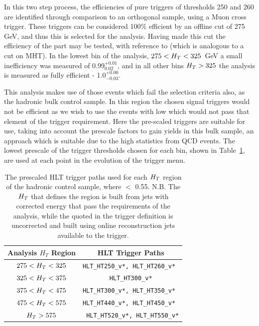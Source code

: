 In this two step process, the efficiencies of pure \HT triggers of thresholds 250 and 260 are identified through comparison to an orthogonal sample, using a Muon \HT cross trigger. These triggers can be considered 100\% efficient by an offline \HT cut of 275 GeV, and thus this is selected for the analysis. Having made this cut the efficiency of the \MHT part may be tested, with reference to \alt (which is analogous to a cut on MHT). In the lowest bin of the analysis, $275 < H_{T}  < 325$~GeV a small inefficiency was measured of 0.99$^{+0.01}_{0.02}$, and in all other bins $H_{T}  > 325$ the analysis is measured as fully efficient - 1.0$^{+0.00}_{-0.03}$.  

This analysis makes use of those events which fail the \alt selection criteria also, as the hadronic bulk control sample. In this region the chosen signal triggers would not be efficient as we wish to use the events with low \MHT which would not pass that element of the trigger requirement. Here the pre-scaled \HT triggers are suitable for use, taking into account the prescale factors to gain yields in this bulk sample, an approach which is suitable due to the high statistics from QCD events. The lowest prescale of the trigger thresholds chosen for each \HT bin, shown in Table~\ref{tab:bulktrig}, are used at each point in the evolution of the trigger menu.  


\begin{table}[htbp]
\centering
\begin{tabular}{ c c }
\hline
\hline
Analysis $H_{T}$ Region & HLT Trigger Paths\\
\hline
\hline
$275 < H_{T}  < 325$ & \verb!HLT_HT250_v*, HLT_HT260_v* !\\
$325 < H_{T}  < 375$ & \verb!HLT_HT300_v*!\\
$375 < H_{T}  < 475$ & \verb!HLT_HT300_v*, HLT_HT350_v* !\\
$475 < H_{T}  < 575$ &\verb!HLT_HT440_v*, HLT_HT450_v* !\\
$H_{T}  > 575$ & \verb! HLT_HT520_v*, HLT_HT550_v*!\\
\hline
\end{tabular}
\caption{\label{tab:bulktrig}The prescaled HLT trigger paths used for each $H_{T} $ region of the hadronic control sample, where \alt $<$ 0.55.  N.B. The $H_{T} $ that defines the region is built from jets with corrected energy that pass the requirements of the analysis, while the \HT quoted in the trigger definition is uncorrected and built using online reconstruction jets available to the trigger.}
\end{table}



